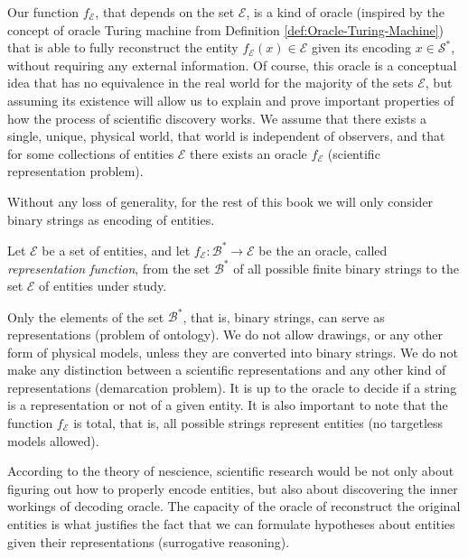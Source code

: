 Our function $f_\mathcal{E}$, that depends on the set $\mathcal{E}$, is a kind of oracle (inspired by the concept of oracle Turing machine from Definition \ref{def:Oracle-Turing-Machine}) that is able to fully reconstruct the entity $f_\mathcal{E} (x) \in \mathcal{E}$ given its encoding $x \in \mathcal{S}^\ast$, without requiring any external information. Of course, this oracle is a conceptual idea that has no equivalence in the real world for the majority of the sets $\mathcal{E}$, but assuming its existence will allow us to explain and prove important properties of how the process of scientific discovery works. We assume that there exists a single, unique, physical world, that world is independent of observers, and that for some collections of entities $\mathcal{E}$ there exists an oracle $f_\mathcal{E}$ (scientific representation problem).

Without any loss of generality, for the rest of this book we will only consider binary strings as encoding of entities.

\begin{definition}
\label{def:descriptions_topic}
Let $\mathcal{E}$ be a set of entities, and let $f_\mathcal{E}:\mathcal{B}^\ast \rightarrow \mathcal{E}$ be the an oracle, called \emph{representation function}, from the set $\mathcal{B}^\ast$ of all possible finite binary strings to the set $\mathcal{E}$ of entities under study.
\end{definition}

Only the elements of the set $\mathcal{B}^\ast$, that is, binary strings, can serve as representations (problem of ontology). We do not allow drawings, or any other form of physical models, unless they are converted into binary strings. We do not make any distinction between a scientific representations and any other kind of representations (demarcation problem). It is up to the oracle to decide if a string is a representation or not of a given entity. It is also important to note that the function $f_\mathcal{E}$ is total, that is, all possible strings represent entities (no targetless models allowed).

According to the theory of nescience, scientific research would be not only about figuring out how to properly encode entities, but also about discovering the inner workings of decoding oracle. The capacity of the oracle of reconstruct the original entities is what justifies the fact that we can formulate hypotheses about entities given their representations (surrogative reasoning).

